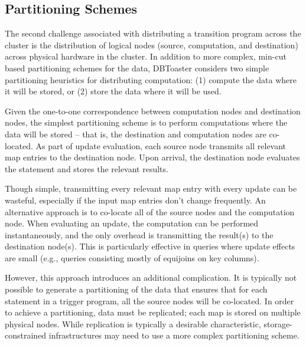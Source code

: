 \subsection{Partitioning Schemes}
The second challenge associated with distributing a transition program across the cluster is the distribution of logical nodes (source, computation, and destination) across physical hardware in the cluster.  In addition to more complex, min-cut based partitioning schemes for the data, DBToaster considers two simple partitioning heuristics for distributing computation: (1) compute the data where it will be stored, or (2) store the data where it will be used.  

Given the one-to-one correspondence between computation nodes and destination nodes, the simplest partitioning scheme is to perform computations where the data will be stored -- that is, the destination and computation nodes are co-located.  As part of update evaluation, each source node transmits all relevant map entries to the destination node.  Upon arrival, the destination node evaluates the statement and stores the relevant results.

Though simple, transmitting every relevant map entry with every update can be wasteful, especially if the input map entries don't change frequently.  An alternative approach is to co-locate all of the source nodes and the computation node.  When evaluating an update, the computation can be performed instantaneously, and the only overhead is transmitting the result(s) to the destination node(s).  This is particularly effective in queries where update effects are small (e.g., queries consisting mostly of equijoins on key columns).

However, this approach introduces an additional complication.  It is typically not possible to generate a partitioning of the data that ensures that for each statement in a trigger program, all the source nodes will be co-located.  In order to achieve a partitioning, data must be replicated; each map is stored on multiple physical nodes.  While replication is typically a desirable characteristic, storage-constrained infrastructures may need to use a more complex partitioning scheme.


